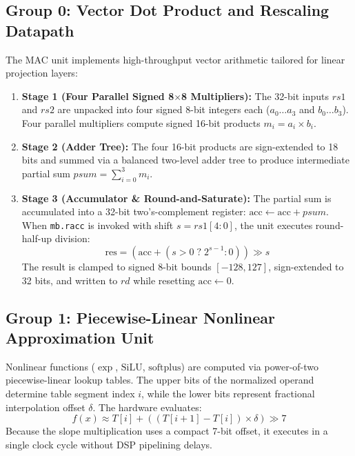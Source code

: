 \documentclass[11pt,a4paper,oneside]{report}
\begin{document}
\subsection{Group 0: Vector Dot Product and Rescaling Datapath}
The MAC unit implements high-throughput vector arithmetic tailored for linear projection layers:
\begin{enumerate}
    \item \textbf{Stage 1 (Four Parallel Signed 8$\times$8 Multipliers):} The 32-bit inputs $rs1$ and $rs2$ are unpacked into four signed 8-bit integers each ($a_0 \dots a_3$ and $b_0 \dots b_3$). Four parallel multipliers compute signed 16-bit products $m_i = a_i \times b_i$.
    \item \textbf{Stage 2 (Adder Tree):} The four 16-bit products are sign-extended to 18 bits and summed via a balanced two-level adder tree to produce intermediate partial sum $psum = \sum_{i=0}^3 m_i$.
    \item \textbf{Stage 3 (Accumulator \& Round-and-Saturate):} The partial sum is accumulated into a 32-bit two's-complement register: $\text{acc} \leftarrow \text{acc} + psum$. When \texttt{mb.racc} is invoked with shift $s = rs1[4:0]$, the unit executes round-half-up division:
    \begin{equation}
        \text{res} = (\text{acc} + (s > 0 \;?\; 2^{s-1} : 0)) \gg s
    \end{equation}
    The result is clamped to signed 8-bit bounds $[-128, 127]$, sign-extended to 32 bits, and written to $rd$ while resetting $\text{acc} \leftarrow 0$.
\end{enumerate}

\subsection{Group 1: Piecewise-Linear Nonlinear Approximation Unit}
Nonlinear functions ($\exp$, $\text{SiLU}$, $\text{softplus}$) are computed via power-of-two piecewise-linear lookup tables. The upper bits of the normalized operand determine table segment index $i$, while the lower bits represent fractional interpolation offset $\delta$. The hardware evaluates:
\begin{equation}
    f(x) \approx T[i] + \left( (T[i+1] - T[i]) \times \delta \right) \gg 7
\end{equation}
Because the slope multiplication uses a compact 7-bit offset, it executes in a single clock cycle without DSP pipelining delays.
\end{document}

